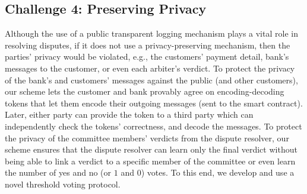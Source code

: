 \subsection{Challenge 4: Preserving Privacy}
 Although the use of a public transparent logging mechanism plays a vital role in resolving disputes, if it does not use a  privacy-preserving mechanism, then the parties' privacy would be violated, e.g., the customers' payment detail,  bank's messages to the customer, or even each arbiter's verdict. To protect the  privacy of the bank's and customers' messages against the public (and other customers),  our scheme lets the customer and bank provably agree on encoding-decoding tokens that let them  encode their outgoing messages (sent to the smart contract). Later, either party can provide the token to a third party which can independently check the tokens' correctness, and decode the messages. To protect the privacy of the committee members' verdicts from the  dispute resolver,  our scheme  ensures that  the dispute resolver can learn only the final verdict without being able to link a verdict to a specific  member of the committee or even learn the number of yes and no (or $1$ and $0$) votes. To this end, we develop and use a novel threshold voting protocol. 
 
 
 
 
